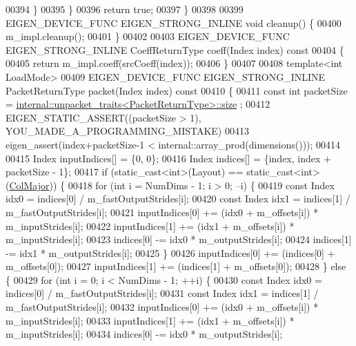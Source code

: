 \begin{DoxyCode}
00394       \}
00395     \}
00396     \textcolor{keywordflow}{return} \textcolor{keyword}{true};
00397   \}
00398 
00399   EIGEN\_DEVICE\_FUNC EIGEN\_STRONG\_INLINE \textcolor{keywordtype}{void} cleanup() \{
00400     m\_impl.cleanup();
00401   \}
00402 
00403   EIGEN\_DEVICE\_FUNC EIGEN\_STRONG\_INLINE CoeffReturnType coeff(Index index)\textcolor{keyword}{ const}
00404 \textcolor{keyword}{  }\{
00405     \textcolor{keywordflow}{return} m\_impl.coeff(srcCoeff(index));
00406   \}
00407 
00408   \textcolor{keyword}{template}<\textcolor{keywordtype}{int} LoadMode>
00409   EIGEN\_DEVICE\_FUNC EIGEN\_STRONG\_INLINE PacketReturnType packet(Index index)\textcolor{keyword}{ const}
00410 \textcolor{keyword}{  }\{
00411     \textcolor{keyword}{const} \textcolor{keywordtype}{int} packetSize = \hyperlink{struct_eigen_1_1internal_1_1unpacket__traits}{internal::unpacket\_traits<PacketReturnType>::size}
      ;
00412     EIGEN\_STATIC\_ASSERT((packetSize > 1), YOU\_MADE\_A\_PROGRAMMING\_MISTAKE)
00413     eigen\_assert(index+packetSize-1 < internal::array\_prod(dimensions()));
00414 
00415     Index inputIndices[] = \{0, 0\};
00416     Index indices[] = \{index, index + packetSize - 1\};
00417     \textcolor{keywordflow}{if} (static\_cast<int>(Layout) == static\_cast<int>(\hyperlink{group__enums_ggaacded1a18ae58b0f554751f6cdf9eb13a0cbd4bdd0abcfc0224c5fcb5e4f6669a}{ColMajor})) \{
00418       \textcolor{keywordflow}{for} (\textcolor{keywordtype}{int} i = NumDims - 1; i > 0; --i) \{
00419         \textcolor{keyword}{const} Index idx0 = indices[0] / m\_fastOutputStrides[i];
00420         \textcolor{keyword}{const} Index idx1 = indices[1] / m\_fastOutputStrides[i];
00421         inputIndices[0] += (idx0 + m\_offsets[i]) * m\_inputStrides[i];
00422         inputIndices[1] += (idx1 + m\_offsets[i]) * m\_inputStrides[i];
00423         indices[0] -= idx0 * m\_outputStrides[i];
00424         indices[1] -= idx1 * m\_outputStrides[i];
00425       \}
00426       inputIndices[0] += (indices[0] + m\_offsets[0]);
00427       inputIndices[1] += (indices[1] + m\_offsets[0]);
00428     \} \textcolor{keywordflow}{else} \{
00429       \textcolor{keywordflow}{for} (\textcolor{keywordtype}{int} i = 0; i < NumDims - 1; ++i) \{
00430         \textcolor{keyword}{const} Index idx0 = indices[0] / m\_fastOutputStrides[i];
00431         \textcolor{keyword}{const} Index idx1 = indices[1] / m\_fastOutputStrides[i];
00432         inputIndices[0] += (idx0 + m\_offsets[i]) * m\_inputStrides[i];
00433         inputIndices[1] += (idx1 + m\_offsets[i]) * m\_inputStrides[i];
00434         indices[0] -= idx0 * m\_outputStrides[i];

\end{DoxyCode}
